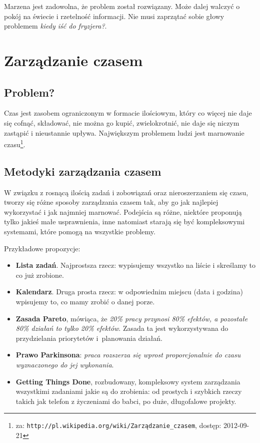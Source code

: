 \documentclass[pdflatex,11pt]{aghdpl}
\begin{document}
Marzena jest zadowolna, że problem został rozwiązany. Może dalej walczyć o pokój na świecie i rzetelność informacji. Nie musi zaprzątać sobie głowy problemem \textit{kiedy iść do fryzjera?}.


\chapter{Zarządzanie czasem}

\section{Problem?}

Czas jest zasobem ograniczonym w formacie ilościowym, który co więcej nie daje się cofnąć, składować, nie można go kupić, zwielokrotnić, nie daje się niczym zastąpić i nieustannie upływa. Największym problemem ludzi jest marnowanie czasu\footnote{za: \texttt{http://pl.wikipedia.org/wiki/Zarządzanie\_czasem}, dostęp: 2012-09-21}.

\section{Metodyki zarządzania czasem}

W związku z rosnącą ilością zadań i zobowiązań oraz nieroszerzaniem się czasu, tworzy się różne sposoby zarządzania czasem tak, aby go jak najlepiej wykorzystać i jak najmniej marnować. Podejścia są różne, niektóre proponują tylko jakieś małe usprawnienia, inne natomiast starają się być kompleksowymi systemami, które pomogą na wszystkie problemy.

Przykładowe propozycje:
\begin{itemize}
\item \textbf{Lista zadań}. Najprostsza rzecz: wypisujemy wszystko na liście i skreślamy to co już zrobione.
\item \textbf{Kalendarz}. Druga prosta rzecz: w odpowiednim miejscu (data i godzina) wpisujemy to, co mamy zrobić o danej porze.
\item \textbf{Zasada Pareto}, mówiąca, że \textit{20\% pracy przynosi 80\% efektów, a pozostałe 80\% działań to tylko 20\% efektów}. Zasada ta jest wykorzystywana do przydzielania priorytetów i~planowania działań.
\item \textbf{Prawo Parkinsona}: \textit{praca rozszerza się wprost proporcjonalnie do czasu wyznaczonego do jej wykonania}.
\item \textbf{Getting Things Done}, rozbudowany, kompleksowy system zarządzania wszystkimi zadaniami jakie są do zrobienia: od prostych i szybkich rzeczy takich jak telefon z życzeniami do babci, po duże, długofalowe projekty.
\end{itemize}
\end{document}
